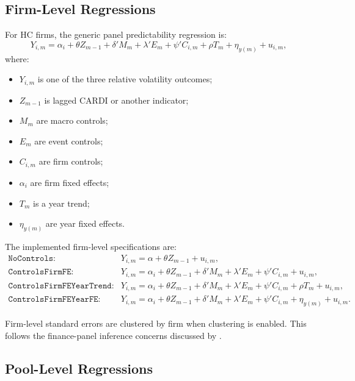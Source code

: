 \documentclass[11pt]{article}
\begin{document}
\subsection{Firm-Level Regressions}

For HC firms, the generic panel predictability regression is:
\begin{equation}
Y_{i,m}
=
\alpha_i
+ \theta Z_{m-1}
+ \delta' M_m
+ \lambda' E_m
+ \psi' C_{i,m}
+ \rho T_m
+ \eta_{y(m)}
+ u_{i,m},
\end{equation}
where:
\begin{itemize}
  \item \(Y_{i,m}\) is one of the three relative volatility outcomes;
  \item \(Z_{m-1}\) is lagged CARDI or another indicator;
  \item \(M_m\) are macro controls;
  \item \(E_m\) are event controls;
  \item \(C_{i,m}\) are firm controls;
  \item \(\alpha_i\) are firm fixed effects;
  \item \(T_m\) is a year trend;
  \item \(\eta_{y(m)}\) are year fixed effects.
\end{itemize}

The implemented firm-level specifications are:
\[
\begin{array}{ll}
\texttt{NoControls}:
& Y_{i,m} = \alpha + \theta Z_{m-1} + u_{i,m},\\[4pt]
\texttt{ControlsFirmFE}:
& Y_{i,m} = \alpha_i + \theta Z_{m-1} + \delta'M_m + \lambda'E_m + \psi'C_{i,m} + u_{i,m},\\[4pt]
\texttt{ControlsFirmFEYearTrend}:
& Y_{i,m} = \alpha_i + \theta Z_{m-1} + \delta'M_m + \lambda'E_m + \psi'C_{i,m}
  + \rho T_m + u_{i,m},\\[4pt]
\texttt{ControlsFirmFEYearFE}:
& Y_{i,m} = \alpha_i + \theta Z_{m-1} + \delta'M_m + \lambda'E_m + \psi'C_{i,m}
  + \eta_{y(m)} + u_{i,m}.
\end{array}
\]

Firm-level standard errors are clustered by firm when clustering is enabled.
This follows the finance-panel inference concerns discussed by \citet{petersen2009}.

\subsection{Pool-Level Regressions}
\end{document}
